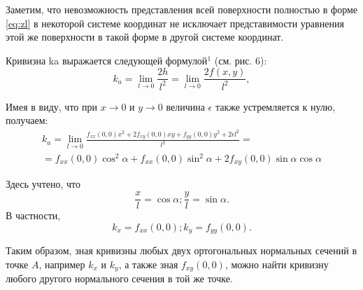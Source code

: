 \documentclass[a4paper,12pt]{book}
\begin{document}
	Заметим, что невозможность представления всей поверхности полностью в форме \eqref{eq:zl} в некоторой системе координат не исключает представимости уравнения этой же поверхности в такой форме в другой системе координат.

  Кривизна ka выражается следующей формулой$^1$ (см. рис. 6):
  \begin{displaymath}
  		k_a=\lim_{l \to 0}
  		\frac{2h}{l^{2}} =
  		\lim_{l \to 0}
  		\frac{2f(x,y)}{l^2},
	\end{displaymath}  
	
	Имея в виду, что при $x \rightarrow 0$ и $y \rightarrow 0$ величина $\epsilon$ также устремляется к нулю, получаем:		
	\begin{equation}
	\label{eq:z5l}
	\begin{split}
		k_a=\lim_{l \to 0}
		\frac{f_{xx}(0,0)x^2 + 2f_{xy}(0,0)xy +f_{yy}(0,0)y^2 + 2\epsilon l^2}{l^2} = \\
		=f_{xx}(0,0)\cos^2{\alpha} + f_{xx}(0,0)\sin^2{\alpha} + 2f_{xy}(0,0)\sin{\alpha}\cos{\alpha} 
	\end{split}
	\end{equation}
	
	Здесь учтено, что
	\begin{displaymath}
		\frac{x}{l}=\cos{\alpha};
		\frac{y}{l}=\sin{\alpha}.
	\end{displaymath}
	В частности, 
	\begin{equation}
		\label{eq:z6l}
		k_x=f_{xx}(0,0);
		k_y=f_{yy}(0,0).
	\end{equation}
	
	Таким образом, зная кривизны любых двух ортогональных
нормальных сечений в точке $A$, например $k_x$ и $k_y$, а также зная $f_{xy}(0,0)$, можно найти кривизну любого другого нормального сечения в той же точке.
\end{document}
